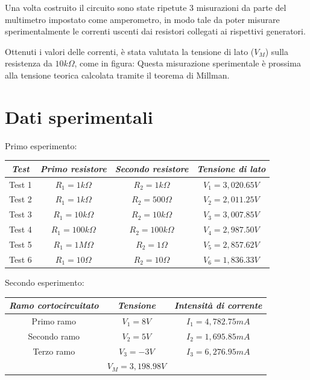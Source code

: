     Una volta costruito il circuito sono state ripetute 3 misurazioni da parte del multimetro impostato come 
    amperometro, in modo tale da poter misurare sperimentalmente le correnti uscenti dai resistori collegati ai rispettivi generatori.\par
    Ottenuti i valori delle correnti, è stata valutata la tensione di lato ($V_M$) sulla resistenza da $10k\Omega$, come in figura:
    Questa misurazione sperimentale è prossima alla tensione teorica calcolata tramite il teorema di Millman.\par



    \section{Dati sperimentali}
    \begin{center}
        Primo esperimento: \par
    \begin{tabular}{|c|c|c|c|}
        \hline
        \textit{Test} & \textit{Primo resistore} & \textit{Secondo resistore} & \textit{Tensione di lato} \\
        \hline
        Test 1 & $R_1 =1k\Omega$ & $R_2=1k\Omega$ & $V_1=3,020.65V$\\
        \hline
        Test 2 & $R_1 =1k\Omega$ & $R_2=500\Omega$ & $V_2=2,011.25V$\\
        \hline
        Test 3 & $R_1 =10k\Omega$ & $R_2=10k\Omega$ & $V_3=3,007.85V$\\
        \hline
        Test 4 & $R_1 =100k\Omega$ & $R_2=100k\Omega$ & $V_4=2,987.50V$\\
        \hline
        Test 5 & $R_1 =1M\Omega$ & $R_2=1\Omega$ & $V_5=2,857.62V$\\
        \hline
        Test 6 & $R_1 =10\Omega$ & $R_2=10\Omega$ & $V_6=1,836.33V$\\
        \hline
    
    \end{tabular}
    \end{center}
    
    \begin{center}
        Secondo esperimento: \par
    \begin{tabular}{|c|c|c|}
        \hline
        \textit{Ramo cortocircuitato} & \textit{Tensione} & \textit{Intensità di corrente} \\
        \hline
        Primo ramo & $V_1 = 8V$ & $I_1 = 4,782.75 mA$\\
        \hline
        Secondo ramo & $V_2 = 5V$ & $I_2 = 1,695.85 mA$\\
        \hline
        Terzo ramo & $V_3 = -3V$ & $I_3 = 6,276.95 mA$\\
        \hline
        & $V_M = 3,198.98V$&\\
        \hline
    
    \end{tabular}
    \end{center}


